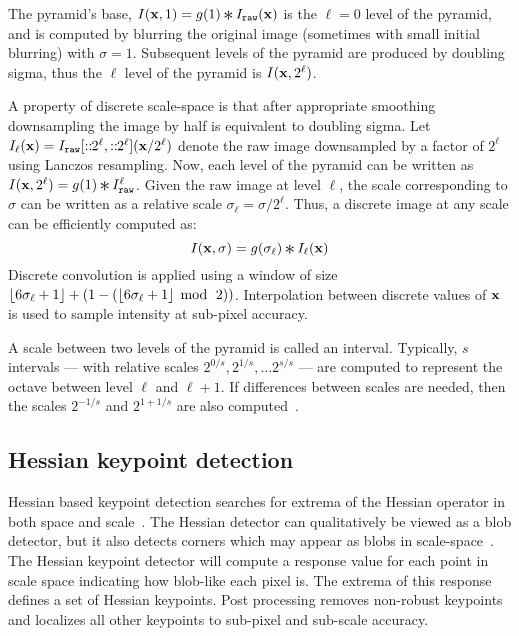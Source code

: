             \ScaleSpaceFigure{}

            The pyramid's base, %
            $\img(\pt, 1) = g( 1 ) \conv \rawimg(\pt)$ %
            is the $\ell=0$\th{} level of the pyramid, and is computed by blurring the original image (sometimes
            with small initial blurring) with $\sigma=1$. Subsequent levels of the pyramid are produced by doubling
            sigma, thus the $\ell$\th{} level of the pyramid is $I(\mathbf{x}, 2^\ell)$.

            A property of discrete scale-space is that after appropriate smoothing downsampling the image by half
            is equivalent to doubling sigma. Let
            $I_\ell(\mathbf{x}) = I_{\tt{raw}}[::\mkern-6mu2^{\ell},::\mkern-6mu2^{\ell}]({\mathbf{x}} / {2^{\ell}})$ 
            denote the raw image downsampled by a factor of $2^{\ell}$ using Lanczos resampling. Now, each level of
            the pyramid can be written as %
            $\img(\pt, 2^\ell) = g( 1 ) \conv \rawimg^\ell$. Given the raw image at level $\ell$, the scale
            corresponding to $\sigma$ can be written as a relative scale
            $\sigma_\ell = \sigma / 2^\ell$.
            Thus, a discrete image at any scale can be efficiently computed as:
            \begin{equation}
                \img(\pt, \sigma) =
                    g(\sigma_\ell) \conv \img_\ell(\pt)
            \end{equation}
            Discrete convolution is applied using a window of size
              $\left\lfloor{} 6\sigma_\ell + 1 \right\rfloor + (1 -
              (\left\lfloor{} 6\sigma_\ell + 1 \right\rfloor\; \operatorname{mod}{} \;\,2))$.
            Interpolation between discrete values of $\mathbf{x}$ is used to
              sample intensity at sub-pixel accuracy.

            A scale between two levels of the pyramid is called an interval. Typically, $s$ intervals --- with
            relative scales $2^{0/s}, 2^{1/s}, \ldots 2^{s/s}$ --- are computed to represent the octave between
            level $\ell$ and $\ell + 1$. If differences between scales are needed, then the scales $2^{-1/s}$ and
            $2^{1 + 1/s}$ are also computed~\cite{lowe_distinctive_2004}.

    \subsection{Hessian keypoint detection}

        Hessian based keypoint detection searches for extrema of the Hessian operator in both space and
        scale~\cite{beaudet_rotationally_1978, lindeberg_shape_adapted_1994}. The Hessian detector can qualitatively
        be viewed as a blob detector, but it also detects corners which may appear as blobs in
        scale-space~\cite{tuytelaars_local_2007}. The Hessian keypoint detector will compute a response value for
        each point in scale space indicating how blob-like each pixel is. The extrema of this response defines a
        set of Hessian keypoints. Post processing removes non-robust keypoints and localizes all other keypoints to
        sub-pixel and sub-scale accuracy.

